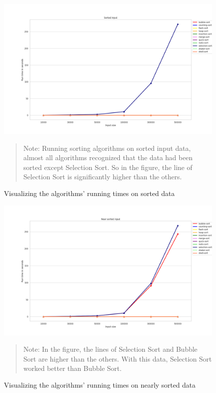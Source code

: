 \documentclass[11pt,a4paper]{article}
\newenvironment{fignote}{\begin{quote}\footnotesize}{\end{quote}}
\begin{document}
\begin{figure}[H]
  \includegraphics[width = 16cm]{plot/sorted_line.png}
  \centering
  \begin{fignote} 
    Note: Running sorting algorithms on sorted input data, almost all algorithms recognized that 
    the data had been sorted except Selection Sort. So in the figure, the line of Selection Sort is significantly higher than the others.
  \end{fignote}
  \caption{Visualizing the algorithms' running times on sorted data}
\end{figure}

\begin{figure}[H]
  \includegraphics[width = 16cm]{plot/nsorted_line.png}
  \centering
  \begin{fignote} 
    Note: In the figure, the lines of Selection Sort and Bubble Sort are higher than the others.
    With this data, Selection Sort worked better than Bubble Sort.
  \end{fignote}
  \caption{Visualizing the algorithms' running times on nearly sorted data}
\end{figure}
\end{document}
